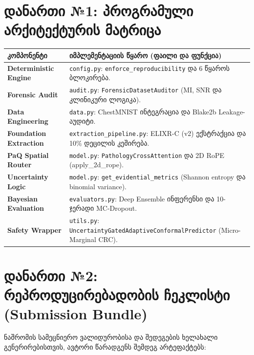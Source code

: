 \documentclass[12pt,a4paper,oneside]{report}
\begin{document}
\chapter*{დანართი №1: პროგრამული არქიტექტურის მატრიცა}
\vspace{-0.5cm}
\begin{table}[H]
\small
\centering
\begin{tabularx}{\textwidth}{>{\raggedright\arraybackslash}p{} L}
\toprule
\textbf{კომპონენტი} & \textbf{იმპლემენტაციის წყარო (ფაილი და ფუნქცია)} \\
\midrule
\textbf{Deterministic Engine} & \texttt{config.py}: \texttt{enforce\_reproducibility} და 6 წყაროს ბლოკირება. \\
\midrule
\textbf{Forensic Audit} & \texttt{audit.py}: \texttt{ForensicDatasetAuditor} (MI, SNR და კლინიკური ლოგიკა). \\
\midrule
\textbf{Data Engineering} & \texttt{data.py}: ChestMNIST ინტეგრაცია და Blake2b Leakage-აუდიტი. \\
\midrule
\textbf{Foundation Extraction} & \texttt{extraction\_pipeline.py}: ELIXR-C (v2) ექსტრაქცია და 10\% დეცილის კეშირება. \\
\midrule
\textbf{PaQ Spatial Router} & \texttt{model.py}: \texttt{PathologyCrossAttention} და 2D RoPE (apply\_2d\_rope). \\
\midrule
\textbf{Uncertainty Logic} & \texttt{model.py}: \texttt{get\_evidential\_metrics} (Shannon entropy და binomial variance). \\
\midrule
\textbf{Bayesian Evaluation} & \texttt{evaluators.py}: Deep Ensemble ინფერენსი და 10-ჯერადი MC-Dropout. \\
\midrule
\textbf{Safety Wrapper} & \texttt{utils.py}: \texttt{UncertaintyGatedAdaptiveConformalPredictor} (Micro-Marginal CRC). \\
\bottomrule
\end{tabularx}
\end{table}
\chapter*{დანართი №2: რეპროდუცირებადობის ჩეკლისტი (Submission Bundle)}
ნაშრომის სამეცნიერო ვალიდურობისა და შედეგების ხელახალი გენერირებისთვის, ავტორი წარადგენს შემდეგ არტეფაქტებს:
\end{document}
